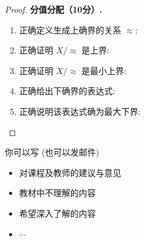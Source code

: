 \documentclass[a4paper, justified]{tufte-handout}
\begin{document}
\begin{proof}
  \textbf{分值分配（10分）.}
  \begin{enumerate}[(1)]
    \item 正确定义生成上确界的关系 $\approx$: 
    \item 正确证明 $X/\approx$ 是上界: 
    \item 正确证明 $X/\approx$ 是最小上界: 
    \item 正确给出下确界的表达式: 
    \item 正确说明该表达式确为最大下界: 
  \end{enumerate}
\end{proof}


\begincorrection

\beginfb

你可以写 (也可以发邮件)
\begin{itemize}
  \item 对课程及教师的建议与意见
  \item 教材中不理解的内容
  \item 希望深入了解的内容
  \item $\cdots$
\end{itemize}
\end{document}
